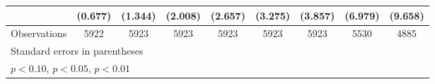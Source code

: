 \begin{table}[htbp]
\begin{tabular}{l*{8}{c}}
                    &     (0.677)         &     (1.344)         &     (2.008)         &     (2.657)         &     (3.275)         &     (3.857)         &     (6.979)         &     (9.658)         \\
\hline
Observations        &        5922         &        5923         &        5923         &        5923         &        5923         &        5923         &        5530         &        4885         \\
\hline\hline
\multicolumn{9}{l}{\footnotesize Standard errors in parentheses}\\
\multicolumn{9}{l}{\footnotesize \sym{*} \(p<0.10\), \sym{**} \(p<0.05\), \sym{***} \(p<0.01\)}\\
\end{tabular}
\end{table}
